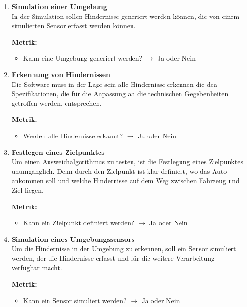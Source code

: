 \begin{enumerate}[leftmargin=*]
    \item \textbf{Simulation einer Umgebung}\\
    In der Simulation sollen Hindernisse generiert werden können, die von einem simulierten Sensor erfasst werden können.

    \textbf{Metrik:} 
    \begin{itemize}
        \item Kann eine Umgebung generiert werden? $\to$ Ja oder Nein
    \end{itemize}
    
    \item \textbf{Erkennung von Hindernissen}\\
    Die Software muss in der Lage sein alle Hindernisse erkennen die den Spezifikationen, 
    die für die Anpassung an die technischen Gegebenheiten getroffen werden, 
    entsprechen.

    \textbf{Metrik:} 
    \begin{itemize}
        \item Werden alle Hindernisse erkannt? $\to$ Ja oder Nein
    \end{itemize}
    
    \item \textbf{Festlegen eines Zielpunktes}\\
    Um einen Ausweichalgorithmus zu testen, ist die Festlegung eines Zielpunktes unumgänglich. 
    Denn durch den Zielpunkt ist klar definiert, wo das Auto ankommen soll und welche Hindernisse auf dem Weg zwischen Fahrzeug und Ziel liegen.

    \textbf{Metrik:} 
    \begin{itemize}
        \item Kann ein Zielpunkt definiert werden? $\to$ Ja oder Nein
    \end{itemize}
    
    \item \textbf{Simulation eines Umgebungssensors}\\
    Um die Hindernisse in der Umgebung zu erkennen, soll ein Sensor simuliert werden, der die Hindernisse erfasst und für die weitere Verarbeitung verfügbar macht.

    \textbf{Metrik:}
    \begin{itemize}
        \item Kann ein Sensor simuliert werden? $\to$ Ja oder Nein
    \end{itemize}
    

\end{enumerate}
